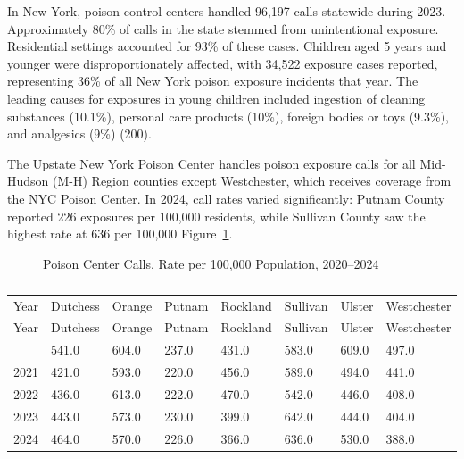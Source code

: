 \documentclass[
  english,
  letterpaper,
]{report}
\begin{document}
In New York, poison control centers handled 96,197 calls statewide
during 2023. Approximately 80\% of calls in the state stemmed from
unintentional exposure. Residential settings accounted for 93\% of these
cases. Children aged 5 years and younger were disproportionately
affected, with 34,522 exposure cases reported, representing 36\% of all
New York poison exposure incidents that year. The leading causes for
exposures in young children included ingestion of cleaning substances
(10.1\%), personal care products (10\%), foreign bodies or toys (9.3\%),
and analgesics (9\%) (200).

The Upstate New York Poison Center handles poison exposure calls for all
Mid-Hudson (M-H) Region counties except Westchester, which receives
coverage from the NYC Poison Center. In 2024, call rates varied
significantly: Putnam County reported 226 exposures per 100,000
residents, while Sullivan County saw the highest rate at 636 per 100,000
Figure~\ref{fig-poison-control-calls}.

\begin{figure}


\caption{\label{fig-poison-control-calls}Poison Center Calls, Rate per
100,000 Population, 2020--2024}

\end{figure}%

\begin{longtable}[]{@{}llllllll@{}}

\caption{\label{tbl-poison-control-calls}Poison Center Calls, Rate per
100,000 Population, 2020--2024}

\tabularnewline

\caption{}\label{T_e7f71}\tabularnewline
\toprule\noalign{}
Year & Dutchess & Orange & Putnam & Rockland & Sullivan & Ulster &
Westchester \\
\midrule\noalign{}
\endfirsthead
\toprule\noalign{}
Year & Dutchess & Orange & Putnam & Rockland & Sullivan & Ulster &
Westchester \\
\midrule\noalign{}
\endhead
\bottomrule\noalign{}
\endlastfoot
2020 & 541.0 & 604.0 & 237.0 & 431.0 & 583.0 & 609.0 & 497.0 \\
2021 & 421.0 & 593.0 & 220.0 & 456.0 & 589.0 & 494.0 & 441.0 \\
2022 & 436.0 & 613.0 & 222.0 & 470.0 & 542.0 & 446.0 & 408.0 \\
2023 & 443.0 & 573.0 & 230.0 & 399.0 & 642.0 & 444.0 & 404.0 \\
2024 & 464.0 & 570.0 & 226.0 & 366.0 & 636.0 & 530.0 & 388.0 \\

\end{longtable}
\end{document}

